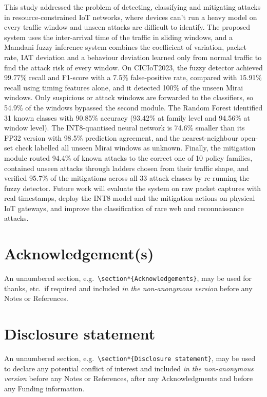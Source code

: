 \documentclass[]{interact}
\theoremstyle{plain}%
\theoremstyle{definition}
\theoremstyle{remark}
\begin{document}
This study addressed the problem of detecting, classifying and mitigating attacks in resource-constrained IoT networks, where devices can't run a heavy model on every traffic window and unseen attacks are difficult to identify. The proposed system uses the inter-arrival time of the traffic in sliding windows, and a Mamdani fuzzy inference system combines the coefficient of variation, packet rate, IAT deviation and a behaviour deviation learned only from normal traffic to find the attack risk of every window. On CICIoT2023, the fuzzy detector achieved 99.77\% recall and F1-score with a 7.5\% false-positive rate, compared with 15.91\% recall using timing features alone, and it detected 100\% of the unseen Mirai windows. Only suspicious or attack windows are forwarded to the classifiers, so 54.9\% of the windows bypassed the second module. The Random Forest identified 31 known classes with 90.85\% accuracy (93.42\% at family level and 94.56\% at window level). The INT8-quantised neural network is 74.6\% smaller than its FP32 version with 98.5\% prediction agreement, and the nearest-neighbour open-set check labelled all unseen Mirai windows as unknown. Finally, the mitigation module routed 94.4\% of known attacks to the correct one of 10 policy families, contained unseen attacks through ladders chosen from their traffic shape, and verified 95.7\% of the mitigations across all 33 attack classes by re-running the fuzzy detector. Future work will evaluate the system on raw packet captures with real timestamps, deploy the INT8 model and the mitigation actions on physical IoT gateways, and improve the classification of rare web and reconnaissance attacks.

\section*{Acknowledgement(s)}

An unnumbered section, e.g.\ \verb"\section*{Acknowledgements}", may be used for thanks, etc.\ if required and included \emph{in the non-anonymous version} before any Notes or References.


\section*{Disclosure statement}

An unnumbered section, e.g.\ \verb"\section*{Disclosure statement}", may be used to declare any potential conflict of interest and included \emph{in the non-anonymous version} before any Notes or References, after any Acknowledgments and before any Funding information.
\end{document}
